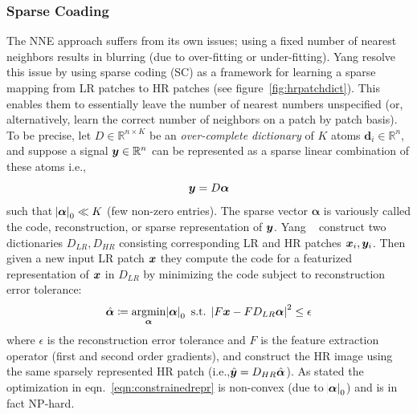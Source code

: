 \subsubsection{Sparse Coading}\label{subsubsec:sparsecoding}
The NNE approach suffers from its own issues; using a fixed number of nearest neighbors results in blurring (due to over-fitting or under-fitting).
%
Yang \etal\cite{yang2008} resolve this issue by using sparse coding (SC) as a framework for learning a sparse mapping from LR patches to HR patches (see figure~\ref{fig:hrpatchdict}).
%
This enables them to essentially leave the number of nearest numbers unspecified (or, alternatively, learn the correct number of neighbors on a patch by patch basis).
%
To be precise, let \(D \in \mathbb{R}^{n \times K}\) be an \textit{over-complete dictionary} of \(K\) atoms \(\bm{d}_i \in \mathbb{R}^n\), and suppose a signal \(\bm{y} \in \mathbb{R}^n\) can be represented as a sparse linear combination of these atoms i.e.,\begin{equation}
                                                                                                                                                                                                                                                                                                 \bm{y} = D\bm{\alpha}
\end{equation}
such that \(\abs{ \bm{\alpha} }_0 \ll K\) (few non-zero entries).
%
The sparse vector \(\bm{\alpha}\) is variously called the code, reconstruction, or sparse representation of \(\bm{y}\).
%
Yang \etal~ construct two dictionaries \(D_{LR}, D_{HR}\) consisting corresponding LR and HR patches \(\bm{x}_i, \bm{y}_i\).
%
Then given a new input LR patch \(\bm{x}\) they compute the code for a featurized representation of \(\bm{x}\) in \(D_{LR}\) by minimizing the code subject to reconstruction error tolerance:
\begin{equation}
    \hat{\bm{\alpha}} \coloneqq \underset{\bm{\alpha}}{\text{argmin}} \abs{ \bm{\alpha} }_0 \text{ s.t. } \abs{ F\bm{x} - FD_{LR}\bm{\alpha} }^2 \leq \epsilon
    \label{eqn:constrainedrepr}
\end{equation}
where \(\epsilon\) is the reconstruction error tolerance and \(F\) is the feature extraction operator (first and second order gradients), and construct the HR image using the same sparsely represented HR patch (i.e.,\(\hat{\bm{y}} = D_{HR} \hat{\bm{\alpha}}\)).
%
As stated the optimization in eqn.~\eqref{eqn:constrainedrepr} is non-convex (due to \(\abs{ \bm{\alpha} }_0\)) and is in fact NP-hard\cite{tilman2015}.
